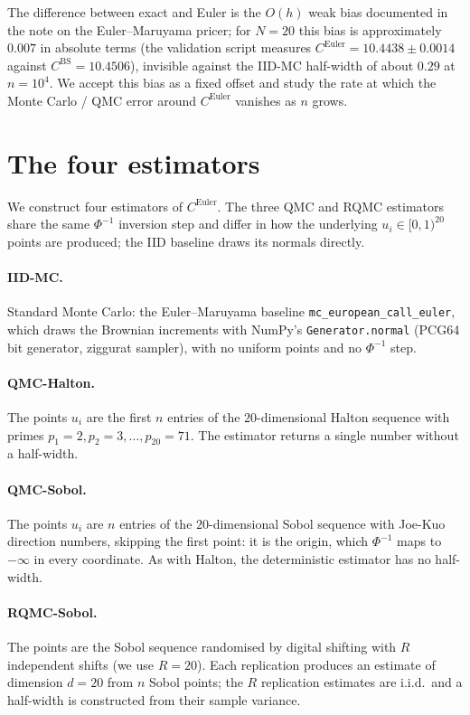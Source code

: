 \documentclass[11pt,a4paper]{article}
\theoremstyle{plain}
\theoremstyle{definition}
\theoremstyle{remark}
\begin{document}
The difference between exact and Euler is the $O(h)$ weak bias
documented in the note on the Euler--Maruyama pricer; for $N = 20$ this
bias is approximately
$0.007$ in absolute terms (the validation script measures
$C^{\mathrm{Euler}} = 10.4438 \pm 0.0014$ against $C^{\mathrm{BS}} =
10.4506$), invisible against the IID-MC half-width of about $0.29$
at $n = 10^4$. We accept this bias as a fixed offset
and study the rate at which the Monte Carlo / QMC error around
$C^{\mathrm{Euler}}$ vanishes as $n$ grows.

\section{The four estimators}
\label{sec:estimators}

We construct four estimators of $C^{\mathrm{Euler}}$. The three QMC
and RQMC estimators share the same $\Phi^{-1}$ inversion step and
differ in how the underlying $u_i \in [0, 1)^{20}$ points are
produced; the IID baseline draws its normals directly.

\paragraph{IID-MC.} Standard Monte Carlo: the Euler--Maruyama
baseline \texttt{mc\_european\_call\_euler}, which draws the Brownian
increments with NumPy's \texttt{Generator.normal} (PCG64 bit
generator, ziggurat sampler), with no uniform points and no
$\Phi^{-1}$ step.

\paragraph{QMC-Halton.} The points $u_i$ are the first $n$ entries
of the $20$-dimensional Halton sequence with primes $p_1 = 2,
p_2 = 3, \ldots, p_{20} = 71$. The estimator returns a single number
without a half-width.

\paragraph{QMC-Sobol.} The points $u_i$ are $n$ entries of the
$20$-dimensional Sobol sequence with Joe-Kuo direction numbers,
skipping the first point: it is the origin, which $\Phi^{-1}$ maps
to $-\infty$ in every coordinate. As with Halton, the deterministic
estimator has no half-width.

\paragraph{RQMC-Sobol.} The points are the Sobol sequence
randomised by digital shifting with $R$ independent shifts (we use
$R = 20$). Each replication produces an estimate of dimension
$d = 20$ from $n$ Sobol points; the $R$ replication estimates are
i.i.d.\ and a half-width is constructed from their sample variance.
\end{document}
